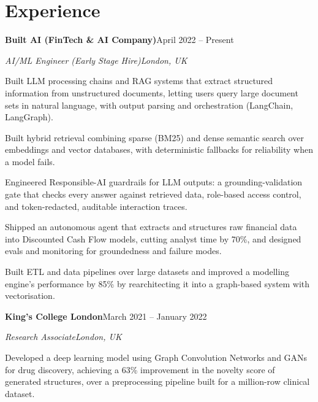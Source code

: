 \documentclass[10pt,a4paper]{article}
\newcommand{\entry}[4]{%
  {\color{company}\bfseries #1}\hfill {\color{muted}#2}\par
  \vspace{1pt}
  {\itshape #3}\hfill {\color{muted}\itshape #4}\par
  \vspace{3pt}%
}
\begin{document}
\section{Experience}
\entry{Built AI (FinTech \& AI Company)}{April 2022 -- Present}{AI/ML Engineer (Early Stage Hire)}{London, UK}
\begin{tight}
  \item Built LLM processing chains and RAG systems that extract structured information from unstructured documents, letting users query large document sets in natural language, with output parsing and orchestration (LangChain, LangGraph).
  \item Built hybrid retrieval combining sparse (BM25) and dense semantic search over embeddings and vector databases, with deterministic fallbacks for reliability when a model fails.
  \item Engineered Responsible-AI guardrails for LLM outputs: a grounding-validation gate that checks every answer against retrieved data, role-based access control, and token-redacted, auditable interaction traces.
  \item Shipped an autonomous agent that extracts and structures raw financial data into Discounted Cash Flow models, cutting analyst time by 70\%, and designed evals and monitoring for groundedness and failure modes.
  \item Built ETL and data pipelines over large datasets and improved a modelling engine's performance by 85\% by rearchitecting it into a graph-based system with vectorisation.
\end{tight}

\entry{King's College London}{March 2021 -- January 2022}{Research Associate}{London, UK}
\begin{tight}
  \item Developed a deep learning model using Graph Convolution Networks and GANs for drug discovery, achieving a 63\% improvement in the novelty score of generated structures, over a preprocessing pipeline built for a million-row clinical dataset.
\end{tight}

\end{document}
